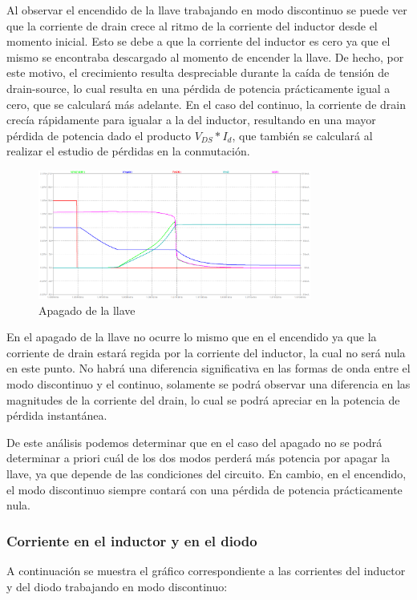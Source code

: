 \documentclass[e4_tp1_main.tex]{subfiles}
\begin{document}
	Al observar el encendido de la llave trabajando en modo discontinuo se puede ver que la corriente de drain crece al ritmo de la corriente del inductor desde el momento inicial. Esto se debe a que la corriente del inductor es cero ya que el mismo se encontraba descargado al momento de encender la llave. De hecho, por este motivo, el crecimiento resulta despreciable durante la caída de tensión de drain-source, lo cual resulta en una pérdida de potencia prácticamente igual a cero, que se calculará más adelante. En el caso del continuo, la corriente de drain crecía rápidamente para igualar a la del inductor, resultando en una mayor pérdida de potencia dado el producto $V_{DS}*I_d$, que también se calculará al realizar el estudio de pérdidas en la conmutación.
	
	\begin{figure}[H]
		\centering
		\includegraphics[width=0.8\textwidth]{images/ej4/fig2.png}
		\caption{Apagado de la llave}
		\label{fig:my_label}
		
	\end{figure}
	
	En el apagado de la llave no ocurre lo mismo que en el encendido ya que la corriente de drain estará regida por la corriente del inductor, la cual no será nula en este punto. No habrá una diferencia significativa en las formas de onda entre el modo discontinuo y el continuo, solamente se podrá observar una diferencia en las magnitudes de la corriente del drain, lo cual  se podrá apreciar en la potencia de pérdida instantánea. 
	
	De este análisis podemos determinar que en el caso del apagado no se podrá determinar a priori cuál de los dos modos perderá más potencia por apagar la llave, ya que depende de las condiciones del circuito. En cambio, en el encendido, el modo discontinuo siempre contará con una pérdida de potencia prácticamente nula.
	
	
	\subsubsection{Corriente en el inductor y en el diodo}
	A continuación se muestra el gráfico correspondiente a las corrientes del inductor y del diodo trabajando en modo discontinuo:
	
\end{document}

